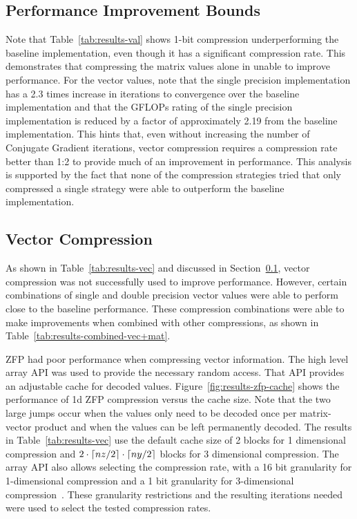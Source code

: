 

\subsection{Performance Improvement Bounds}
\label{sec:results-bounds}
Note that Table~\ref{tab:results-val} shows 1-bit compression underperforming the baseline implementation, even though it has a significant compression rate.
This demonstrates that compressing the matrix values alone in unable to improve performance.
For the vector values, note that the single precision implementation has a 2.3 times increase in iterations to convergence over the baseline implementation and that the GFLOPs rating of the single precision implementation is reduced by a factor of approximately 2.19 from the baseline implementation.
This hints that, even without increasing the number of Conjugate Gradient iterations, vector compression requires a compression rate better than 1:2 to provide much of an improvement in performance.
This analysis is supported by the fact that none of the compression strategies tried that only compressed a single strategy were able to outperform the baseline implementation.

\subsection{Vector Compression}
\label{sec:results-vec}
As shown in Table~\ref{tab:results-vec} and discussed in Section~\ref{sec:results-bounds}, vector compression was not successfully used to improve performance.
However, certain combinations of single and double precision vector values were able to perform close to the baseline performance.
These compression combinations were able to make improvements when combined with other compressions, as shown in Table~\ref{tab:results-combined-vec+mat}.

ZFP had poor performance when compressing vector information.
The high level array API was used to provide the necessary random access.
That API provides an adjustable cache for decoded values.
Figure~\ref{fig:results-zfp-cache} shows the performance of 1d ZFP compression versus the cache size.
Note that the two large jumps occur when the values only need to be decoded once per matrix-vector product and when the values can be left permanently decoded.
The results in Table~\ref{tab:results-vec} use the default cache size of 2 blocks for 1 dimensional compression and \({2\cdot\lceil nz/2\rceil\cdot\lceil ny/2\rceil}\) blocks for 3 dimensional compression.
The array API also allows selecting the compression rate, with a 16 bit granularity for 1-dimensional compression and a 1 bit granularity for 3-dimensional compression~\cite{Lindstrom:2014:zfp}.
These granularity restrictions and the resulting iterations needed were used to select the tested compression rates.

